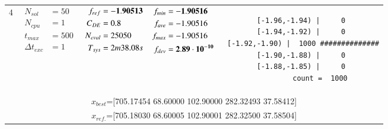\begin{table*} [!t]
\begin{tabular}[c]{ccccc}
4
&
{$\!\begin{aligned}
    N_{sol}        &= 50 \\
	N_{cpu}        &= 1 \\
	t_{max}        &= 500 \\
	\Delta t_{exc} &= 1
\end{aligned}$}
&
{$\!\begin{aligned}
	f_{ref} &= {\bf -1.90513} \\
	C_{DE}   &= 0.8 \\
	N_{eval} &= 25050 \\
	T_{sys}  &= 2m38.08s
\end{aligned}$}
&
{$\!\begin{aligned}
    f_{min} &= {\bf -1.90516} \\
    f_{ave} &= -1.90516 \\
    f_{max} &= -1.90516 \\
    f_{dev} &= {\bf 2.89\cdot 10^{-10}}
\end{aligned}$}
&
\begin{minipage}{4.1cm} \fontsize{5pt}{6pt}
\begin{verbatim}
 [-1.96,-1.94) |     0 
 [-1.94,-1.92) |     0 
 [-1.92,-1.90) |  1000 ##############
 [-1.90,-1.88) |     0 
 [-1.88,-1.85) |     0 
         count =  1000
 \end{verbatim}
\end{minipage} \\
\multicolumn{5}{c}{{\scriptsize $x_{best}$=[705.17454 68.60000 102.90000 282.32493 37.58412]}} \\
\multicolumn{5}{c}{{\scriptsize $x_{ref.}$=[705.18030 68.60005 102.90001 282.32500 37.58504]}} \\

\hline




\end{tabular}
\end{table*}
